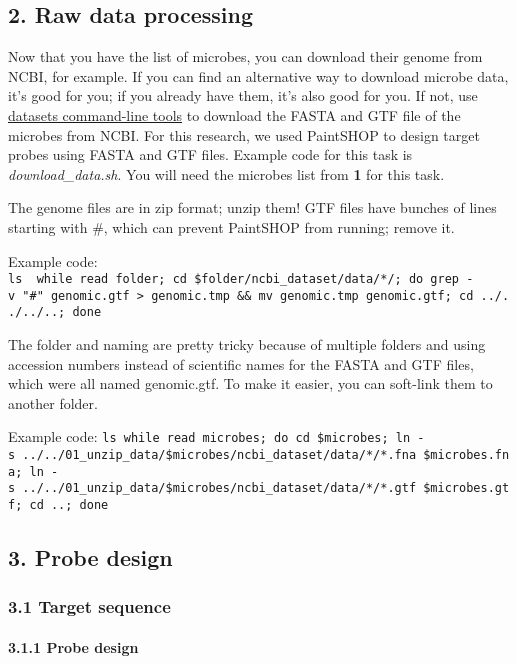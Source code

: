 \documentclass[
]{article}
\begin{document}
\subsection{2. Raw data processing}\label{raw-data-processing}

Now that you have the list of microbes, you can download their genome
from NCBI, for example. If you can find an alternative way to download
microbe data, it's good for you; if you already have them, it's also
good for you. If not, use
\href{https://www.ncbi.nlm.nih.gov/datasets/docs/v2/download-and-install/}{datasets
command-line tools} to download the FASTA and GTF file of the microbes
from NCBI. For this research, we used PaintSHOP to design target probes
using FASTA and GTF files. Example code for this task is
\emph{download\_data.sh}. You will need the microbes list from
\textbf{1} for this task.

The genome files are in zip format; unzip them! GTF files have bunches
of lines starting with \#, which can prevent PaintSHOP from running;
remove it.

Example code:
\texttt{ls\ \textbar{}\ while\ read\ folder;\ cd\ \$folder/ncbi\_dataset/data/*/;\ do\ grep\ -v\ "\#"\ genomic.gtf\ \textgreater{}\ genomic.tmp\ \&\&\ mv\ genomic.tmp\ genomic.gtf;\ cd\ ../../../..;\ done}

The folder and naming are pretty tricky because of multiple folders and
using accession numbers instead of scientific names for the FASTA and
GTF files, which were all named genomic.gtf. To make it easier, you can
soft-link them to another folder.

Example code:
\texttt{ls\textbar{}\ while\ read\ microbes;\ do\ cd\ \$microbes;\ ln\ -s\ ../../01\_unzip\_data/\$microbes/ncbi\_dataset/data/*/*.fna\ \$microbes.fna;\ ln\ -s\ ../../01\_unzip\_data/\$microbes/ncbi\_dataset/data/*/*.gtf\ \$microbes.gtf;\ cd\ ..;\ done}

\subsection{3. Probe design}\label{probe-design}

\subsubsection{3.1 Target sequence}\label{target-sequence}

\paragraph{3.1.1 Probe design}\label{probe-design-1}
\end{document}
